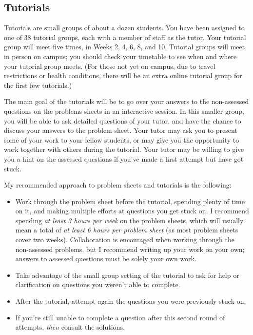 \documentclass[
  a4paper,
]{book}
\providecommand{\tightlist}{%
  \setlength{\itemsep}{0pt}\setlength{\parskip}{0pt}}
\theoremstyle{definition}
\theoremstyle{definition}
\theoremstyle{definition}
\theoremstyle{definition}
\theoremstyle{remark}
\begin{document}
\hypertarget{tutorials}{%
\subsection*{Tutorials}\label{tutorials}}

Tutorials are small groups of about a dozen students. You have been assigned to one of 38 tutorial groups, each with a member of staff as the tutor. Your tutorial group will meet five times, in Weeks 2, 4, 6, 8, and 10. Tutorial groups will meet in person on campus; you should check your timetable to see when and where your tutorial group meets. (For those not yet on campus, due to travel restrictions or health conditions, there will be an extra online tutorial group for the first few tutorials.)

The main goal of the tutorials will be to go over your answers to the non-assessed questions on the problems sheets in an interactive session. In this smaller group, you will be able to ask detailed questions of your tutor, and have the chance to discuss your answers to the problem sheet. Your tutor may ask you to present some of your work to your fellow students, or may give you the opportunity to work together with others during the tutorial. Your tutor may be willing to give you a hint on the assessed questions if you've made a first attempt but have got stuck.

My recommended approach to problem sheets and tutorials is the following:

\begin{itemize}
\tightlist
\item
  Work through the problem sheet before the tutorial, spending plenty of time on it, and making multiple efforts at questions you get stuck on. I recommend spending \emph{at least 3 hours per week} on the problem sheets, which will usually mean a total of \emph{at least 6 hours per problem sheet} (as most problem sheets cover two weeks). Collaboration is encouraged when working through the non-assessed problems, but I recommend writing up your work on your own; answers to assessed questions must be solely your own work.
\item
  Take advantage of the small group setting of the tutorial to ask for help or clarification on questions you weren't able to complete.
\item
  After the tutorial, attempt again the questions you were previously stuck on.
\item
  If you're still unable to complete a question after this second round of attempts, \emph{then} consult the solutions.
\end{itemize}
\end{document}
